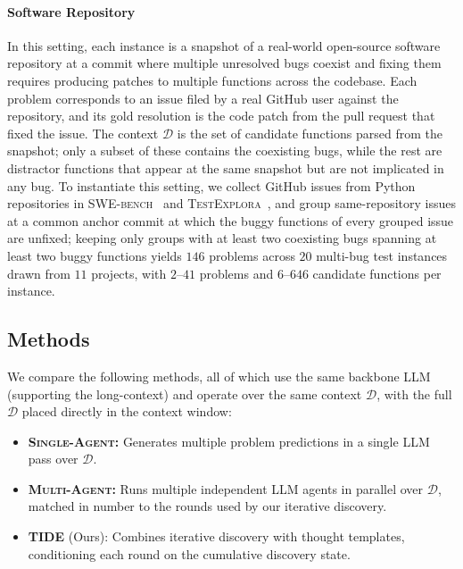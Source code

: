 \paragraph{Software Repository}
In this setting, each instance is a snapshot of a real-world open-source software repository at a commit where multiple unresolved bugs coexist and fixing them requires producing patches to multiple functions across the codebase. Each problem corresponds to an issue filed by a real GitHub user against the repository, and its gold resolution is the code patch from the pull request that fixed the issue. The context $\mathcal{D}$ is the set of candidate functions parsed from the snapshot; only a subset of these contains the coexisting bugs, while the rest are distractor functions that appear at the same snapshot but are not implicated in any bug. To instantiate this setting, we collect GitHub issues from Python repositories in \textsc{SWE-bench}~\cite{SWE-bench} and \textsc{TestExplora}~\cite{TestExplora}, and group same-repository issues at a common anchor commit at which the buggy functions of every grouped issue are unfixed; keeping only groups with at least two coexisting bugs spanning at least two buggy functions yields $146$ problems across $20$ multi-bug test instances drawn from $11$ projects, with $2$--$41$ problems and $6$--$646$ candidate functions per instance.

\subsection{Methods}
We compare the following methods, all of which use the same backbone LLM (supporting the long-context) and operate over the same context $\mathcal{D}$, with the full $\mathcal{D}$ placed directly in the context window:

\begin{itemize}[leftmargin=*]
    \item \textbf{\textsc{Single-Agent:}} Generates multiple problem predictions in a single LLM pass over $\mathcal{D}$.
    \item \textbf{\textsc{Multi-Agent:}} Runs multiple independent LLM agents in parallel over $\mathcal{D}$, matched in number to the rounds used by our iterative discovery.
    \item \textbf{\textsc{TIDE}} (Ours): Combines iterative discovery with thought templates, conditioning each round on the cumulative discovery state.
\end{itemize}



